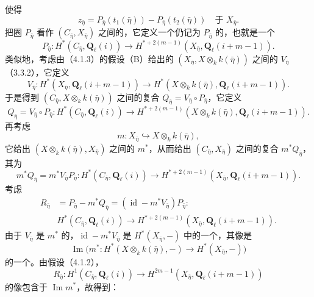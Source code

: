 使得
\begin{equation}\tag{4.4.5}
z_{\bar\eta}=P_{\bar\eta}(t_1(\bar\eta))-P_{\bar\eta}(t_2(\bar\eta))\quad\text{于 }X_{\bar\eta}.
\end{equation}
把圈 $P_{\bar\eta}$ 看作 $(C_{\bar\eta},X_{\bar\eta})$ 之间的，它定义一个仍记为 $P_{\bar\eta}$ 的，也就是一个
\begin{equation}\tag{4.4.6}
P_{\bar\eta}:H^*(C_{\bar\eta},\mathbf Q_\ell(i))\longrightarrow H^{*+2(m-1)}(X_{\bar\eta},\mathbf Q_\ell(i+m-1)).
\end{equation}
类似地，考虑由（4.1.3）的假设（B）给出的 $(X_{\bar\eta},X\otimes_k k(\bar\eta))$ 之间的 $V_{\bar\eta}$（3.3.2），它定义
\begin{equation}\tag{4.4.7}
V_{\bar\eta}:H^*(X_{\bar\eta},\mathbf Q_\ell(i+m-1))\longrightarrow H^*(X\otimes_k k(\bar\eta),\mathbf Q_\ell(i+m-1)).
\end{equation}
于是得到 $(C_{\bar\eta},X\otimes_k k(\bar\eta))$ 之间的复合 $Q_{\bar\eta}=V_{\bar\eta}\circ P_{\bar\eta}$，它定义
\begin{equation}\tag{4.4.8}
Q_{\bar\eta}=V_{\bar\eta}\circ P_{\bar\eta}:H^*(C_{\bar\eta},\mathbf Q_\ell(i))\longrightarrow H^{*+2(m-1)}(X\otimes_k k(\bar\eta),\mathbf Q_\ell(i+m-1)).
\end{equation}
再考虑
\[m:X_{\bar\eta}\hookrightarrow X\otimes_k k(\bar\eta),\]
它给出 $(X\otimes_k k(\bar\eta),X_{\bar\eta})$ 之间的 $m^*$，从而给出 $(C_{\bar\eta},X_{\bar\eta})$ 之间的复合 $m^*Q_{\bar\eta}$，其为
\begin{equation}\tag{4.4.9}
m^*Q_{\bar\eta}=m^*V_{\bar\eta}P_{\bar\eta}:H^*(C_{\bar\eta},\mathbf Q_\ell(i))\longrightarrow H^{*+2(m-1)}(X_{\bar\eta},\mathbf Q_\ell(i+m-1)).
\end{equation}
考虑
\begin{equation}\tag{4.4.10}
\begin{aligned}
R_{\bar\eta}&=P_{\bar\eta}-m^*Q_{\bar\eta}=(\operatorname{id}-m^*V_{\bar\eta})P_{\bar\eta}:\\
&H^*(C_{\bar\eta},\mathbf Q_\ell(i))\longrightarrow H^{*+2(m-1)}(X_{\bar\eta},\mathbf Q_\ell(i+m-1)).
\end{aligned}
\end{equation}
由于 $V_{\bar\eta}$ 是 $m^*$ 的，$\operatorname{id}-m^*V_{\bar\eta}$ 是 $H^*(X_{\bar\eta},-)$ 中的一个，其像是
\[\operatorname{Im}\bigl(m^*:H^*(X\otimes_k k(\bar\eta),-)\longrightarrow H^*(X_{\bar\eta},-)\bigr)\]
的一个。由假设（4.1.2），
\begin{equation}\tag{4.4.11}
R_{\bar\eta}:H^1(C_{\bar\eta},\mathbf Q_\ell(i))\longrightarrow H^{2m-1}(X_{\bar\eta},\mathbf Q_\ell(i+m-1))
\end{equation}
的像包含于 $\operatorname{Im}m^*$，故得到：

